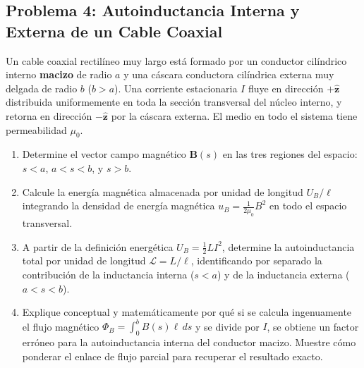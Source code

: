 \documentclass[11pt]{article}
\begin{document}
\subsection*{Problema 4: Autoinductancia Interna y Externa de un Cable Coaxial}
Un cable coaxial rectilíneo muy largo está formado por un conductor cilíndrico interno \textbf{macizo} de radio $a$ y una cáscara conductora cilíndrica externa muy delgada de radio $b$ ($b > a$). Una corriente estacionaria $I$ fluye en dirección $+\hat{\mathbf{z}}$ distribuida uniformemente en toda la sección transversal del núcleo interno, y retorna en dirección $-\hat{\mathbf{z}}$ por la cáscara externa. El medio en todo el sistema tiene permeabilidad $\mu_0$.
\begin{enumerate}
    \item[a)] Determine el vector campo magnético $\mathbf{B}(s)$ en las tres regiones del espacio: $s < a$, $a < s < b$, y $s > b$.
    \item[b)] Calcule la energía magnética almacenada por unidad de longitud $U_B/\ell$ integrando la densidad de energía magnética $u_B = \frac{1}{2\mu_0} B^2$ en todo el espacio transversal.
    \item[c)] A partir de la definición energética $U_B = \frac{1}{2} L I^2$, determine la autoinductancia total por unidad de longitud $\mathcal{L} = L/\ell$, identificando por separado la contribución de la inductancia interna ($s < a$) y de la inductancia externa ($a < s < b$).
    \item[d)] Explique conceptual y matemáticamente por qué si se calcula ingenuamente el flujo magnético $\Phi_B = \int_0^b B(s) \ell \, ds$ y se divide por $I$, se obtiene un factor erróneo para la autoinductancia interna del conductor macizo. Muestre cómo ponderar el enlace de flujo parcial para recuperar el resultado exacto.
\end{enumerate}
\newpage
\end{document}
